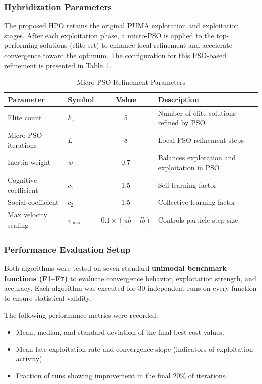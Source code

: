 \documentclass[a4paper,12pt]{article}
\begin{document}
\subsubsection{Hybridization Parameters}
The proposed HPO retains the original PUMA exploration and exploitation stages. 
After each exploitation phase, a micro-PSO is applied to the top-performing solutions (elite set) to enhance local refinement and accelerate convergence toward the optimum. 
The configuration for this PSO-based refinement is presented in Table~\ref{tab:hybridparams}.

\begin{table}[h!]
\centering
\caption{Micro-PSO Refinement Parameters}
\label{tab:hybridparams}
\begin{tabular}{@{}llcl@{}}
\toprule
\textbf{Parameter} & \textbf{Symbol} & \textbf{Value} & \textbf{Description} \\ \midrule
Elite count & $k_{e}$ & 5 & Number of elite solutions refined by PSO \\
Micro-PSO iterations & $L$ & 8 & Local PSO refinement steps \\
Inertia weight & $w$ & 0.7 & Balances exploration and exploitation in PSO \\
Cognitive coefficient & $c_{1}$ & 1.5 & Self-learning factor \\
Social coefficient & $c_{2}$ & 1.5 & Collective-learning factor \\
Max velocity scaling & $v_{\max}$ & $0.1\times(ub-lb)$ & Controls particle step size \\ \bottomrule
\end{tabular}
\end{table}

\subsubsection{Performance Evaluation Setup}
Both algorithms were tested on seven standard \textbf{unimodal benchmark functions (F1--F7)} to evaluate convergence behavior, exploitation strength, and accuracy. 
Each algorithm was executed for 30 independent runs on every function to ensure statistical validity.

The following performance metrics were recorded:
\begin{itemize}
    \item Mean, median, and standard deviation of the final best cost values.
    \item Mean late-exploitation rate and convergence slope (indicators of exploitation activity).
    \item Fraction of runs showing improvement in the final 20\% of iterations.
\end{itemize}
\end{document}
